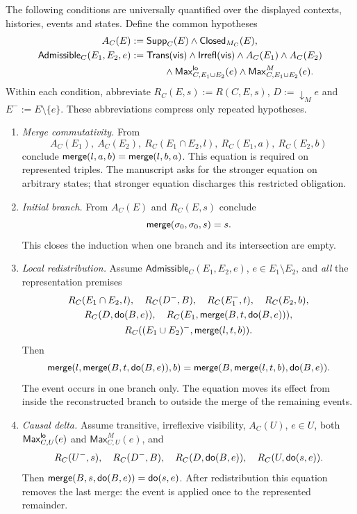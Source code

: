 \begin{definition}\label{def:merge-vcs}
The following conditions are universally quantified over the displayed
contexts, histories, events and states. Define the common hypotheses
\[
\begin{aligned}
 A_C(E)&:=\mathsf{Supp}_C(E)\land\mathsf{Closed}_{M_C}(E),\\
 \mathsf{Admissible}_C(E_1,E_2,e)&:=
   \mathsf{Trans}(\visw)\land\mathsf{Irrefl}(\visw)
   \land A_C(E_1)\land A_C(E_2)\\
 &\hspace{12mm}\land\mathsf{Max}^{\F{lo}}_{C,E_1\cup E_2}(e)
   \land\mathsf{Max}^{M}_{C,E_1\cup E_2}(e).
\end{aligned}
\]
Within each condition, abbreviate $R_C(E,s):=R(C,E,s)$,
$D:=\downarrow_M e$ and $E^-:=E\setminus\{e\}$.
These abbreviations compress only repeated hypotheses.
\begin{enumerate}[label=\textbf{VC\arabic*.},leftmargin=*,itemsep=.65em]
\item \emph{Merge commutativity.} From
\[
 A_C(E_1),\ A_C(E_2),\ R_C(E_1\cap E_2,l),\ R_C(E_1,a),\ R_C(E_2,b)
\]
conclude $\mathsf{merge}(l,a,b)=\mathsf{merge}(l,b,a)$. This equation is required on represented
triples. The manuscript asks for the stronger equation on arbitrary states;
that stronger equation discharges this restricted obligation.

\item \emph{Initial branch.} From $A_C(E)$ and $R_C(E,s)$ conclude
\[
 \mathsf{merge}(\sigma_0,\sigma_0,s)=s.
\]
This closes the induction when one branch and its intersection are empty.

\item \emph{Local redistribution.} Assume $\mathsf{Admissible}_C(E_1,E_2,e)$,
$e\in E_1\setminus E_2$, and \emph{all} the representation premises
\[
\begin{gathered}
 R_C(E_1\cap E_2,l),\quad R_C(D^-,B),\quad
 R_C(E_1^-,t),\quad R_C(E_2,b),\\
 R_C(D,\mathsf{do}(B,e)),\quad R_C(E_1,\mathsf{merge}(B,t,\mathsf{do}(B,e))),\\
 R_C((E_1\cup E_2)^-,\mathsf{merge}(l,t,b)).
\end{gathered}
\]
Then
\[
 \mathsf{merge}(l,\mathsf{merge}(B,t,\mathsf{do}(B,e)),b)
 =\mathsf{merge}(B,\mathsf{merge}(l,t,b),\mathsf{do}(B,e)).
\]
The event occurs in one branch only. The equation moves its effect from
inside the reconstructed branch to outside the merge of the remaining events.

\item \emph{Causal delta.} Assume transitive, irreflexive visibility,
$A_C(U)$, $e\in U$, both $\mathsf{Max}^{\mathsf{lo}}_{C,U}(e)$ and
$\mathsf{Max}^{M}_{C,U}(e)$, and
\[
 R_C(U^-,s),\quad R_C(D^-,B),\quad R_C(D,\mathsf{do}(B,e)),\quad R_C(U,\mathsf{do}(s,e)).
\]
Then $\mathsf{merge}(B,s,\mathsf{do}(B,e))=\mathsf{do}(s,e)$.
After redistribution this equation removes the last merge: the event is
applied once to the represented remainder.


\end{enumerate}
\end{definition}
